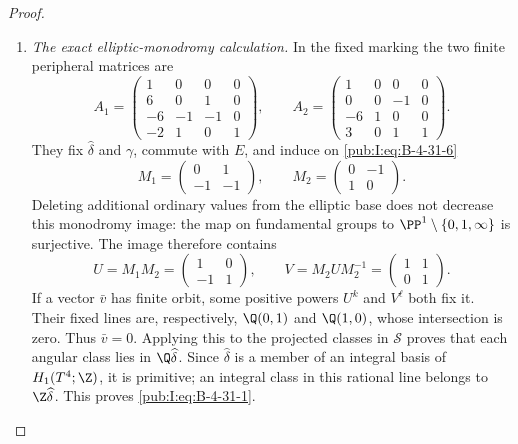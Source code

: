 \begin{proof}
\begin{enumerate}[label=\arabic*.,leftmargin=*]
\item \emph{The exact elliptic-monodromy calculation.}
In the fixed marking the two finite peripheral
matrices are
\begin{equation}
 A_1=\begin{pmatrix}
 1&0&0&0\\6&0&1&0\\-6&-1&-1&0\\-2&1&0&1
 \end{pmatrix},\qquad
 A_2=\begin{pmatrix}
 1&0&0&0\\0&0&-1&0\\-6&1&0&0\\3&0&1&1
 \end{pmatrix}.
\label{pub:I:eq:B-4-31-7}
\end{equation}
They fix $\widehat\delta$ and $\gamma$, commute with $E$,
and induce on \eqref{pub:I:eq:B-4-31-6}
\[
 M_1=\begin{pmatrix}0&1\\-1&-1\end{pmatrix},\qquad
 M_2=\begin{pmatrix}0&-1\\1&0\end{pmatrix}.
\]
Deleting additional ordinary values from the elliptic base
does not decrease this monodromy image: the map on fundamental
groups to $\PP^1\setminus\{0,1,\infty\}$ is surjective.
The image therefore contains
\begin{equation}
 U=M_1M_2=\begin{pmatrix}1&0\\-1&1\end{pmatrix},\qquad
 V=M_2UM_2^{-1}=\begin{pmatrix}1&1\\0&1\end{pmatrix}.
\label{pub:I:eq:B-4-31-8}
\end{equation}
If a vector $\bar v$ has finite orbit, some positive powers
$U^k$ and $V^\ell$ both fix it. Their fixed lines are,
respectively, $\Q(0,1)$ and $\Q(1,0)$, whose intersection
is zero. Thus $\bar v=0$. Applying this to the projected
classes in $\mathscr S$ proves that each angular class lies
in $\Q\widehat\delta$. Since $\widehat\delta$ is a member
of an integral basis of $H_1(T^4;\Z)$, it is primitive;
an integral class in this rational line belongs to
$\Z\widehat\delta$. This proves \eqref{pub:I:eq:B-4-31-1}.


\end{enumerate}
\end{proof}
